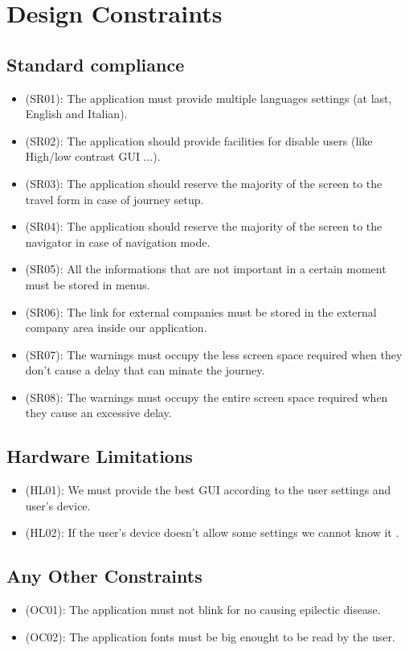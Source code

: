 \documentclass[a4paper,leqno]{book}
\begin{document}
\section{Design Constraints}
\subsection{Standard compliance}
\begin{itemize}
\item (SR01): The application must provide multiple languages settings (at last, English and Italian).
\item (SR02): The application should provide facilities for disable users (like High/low contrast GUI ...).
\item (SR03): The application should reserve the majority of the screen to the travel form in case of journey setup.
\item (SR04): The application should reserve the majority of the screen to the navigator in case of navigation mode.
\item (SR05): All the informations that are not important in a certain moment must be stored in menus.
\item (SR06): The link for external companies must be stored in the external company area inside our application.
\item (SR07): The warnings must occupy the less screen space required when they don't cause a delay that can minate the journey.
\item (SR08): The warnings must occupy the entire screen space required when they cause an excessive delay.
\end{itemize}
\subsection{Hardware Limitations}
\begin{itemize}
\item (HL01): We must provide the best GUI according to the user settings and user's device.
\item (HL02): If the user's device doesn't allow some settings we cannot know it .
\end{itemize}
\subsection{Any Other Constraints}
\begin{itemize}
\item (OC01): The application must not blink for no causing epilectic disease.
\item (OC02): The application fonts must be big enought to be read by the user.
\end{itemize}
\end{document}
